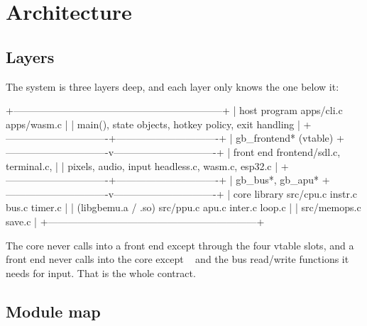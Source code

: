 \documentclass[twoside,a4paper]{refart}
\DeclareRobustCommand\fname[1]{%
  \texttt{\edef\gbemudetok{\detokenize{#1}}%
         \expandafter\seqsplit\expandafter{\gbemudetok}}}
\begin{document}
\section{Architecture}
\label{architecture}

\subsection{Layers}

The system is three layers deep, and each layer only knows the one below
it:

\begin{Code}
  +---------------------------------------------------------------+
  |  host program          apps/cli.c      apps/wasm.c           |
  |  main(), state objects, hotkey policy, exit handling          |
  +-------------------------------+-------------------------------+
                                  |  gb_frontend* (vtable)
  +-------------------------------v-------------------------------+
  |  front end                  frontend/sdl.c, terminal.c,      |
  |  pixels, audio, input        headless.c, wasm.c, esp32.c      |
  +-------------------------------+-------------------------------+
                                  |  gb_bus*, gb_apu*
  +-------------------------------v-------------------------------+
  |  core library               src/cpu.c instr.c bus.c timer.c  |
  |  (libgbemu.a / .so)         src/ppu.c apu.c inter.c loop.c    |
  |                              src/memops.c save.c              |
  +---------------------------------------------------------------+
\end{Code}

The core never calls into a front end except through the four vtable
slots, and a front end never calls into the core except
\fname{gb_apu_buf_pop} and the bus read/write functions it needs for
input.  That is the whole contract.

\subsection{Module map}
\label{module-map}
\end{document}
